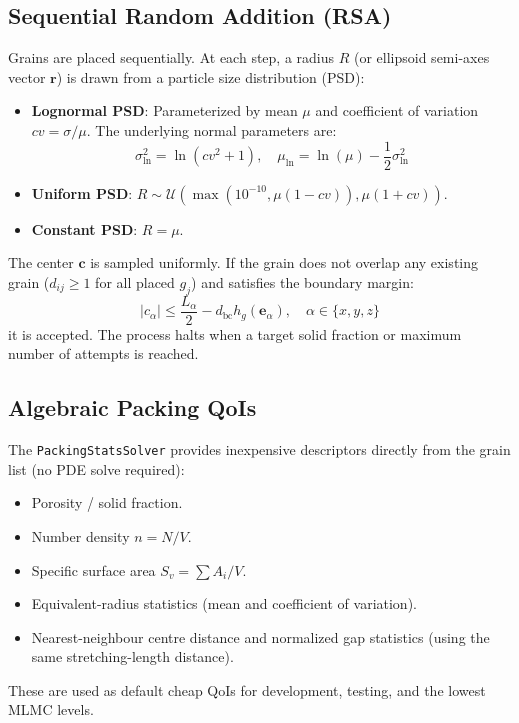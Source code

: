 \documentclass[preprint,12pt]{elsarticle}
\newcommand{\cvec}{\mathbf{c}}
\begin{document}
\subsection{Sequential Random Addition (RSA)}
Grains are placed sequentially. At each step, a radius $R$ (or ellipsoid semi-axes vector $\mathbf{r}$) is drawn from a particle size distribution (PSD):
\begin{itemize}
    \item \textbf{Lognormal PSD}: Parameterized by mean $\mu$ and coefficient of variation $cv = \sigma/\mu$. The underlying normal parameters are:
    \begin{equation}
    \sigma_{\ln}^2 = \ln(cv^2 + 1), \quad \mu_{\ln} = \ln(\mu) - \frac{1}{2} \sigma_{\ln}^2
    \end{equation}
    \item \textbf{Uniform PSD}: $R \sim \mathcal{U}(\max(10^{-10}, \mu(1-cv)), \mu(1+cv))$.
    \item \textbf{Constant PSD}: $R = \mu$.
\end{itemize}
The center $\cvec$ is sampled uniformly. If the grain does not overlap any existing grain ($d_{ij} \ge 1$ for all placed $g_j$) and satisfies the boundary margin:
\begin{equation}
|c_\alpha| \le \frac{L_\alpha}{2} - d_{\text{bc}} h_g(\mathbf{e}_\alpha), \quad \alpha \in \{x, y, z\}
\end{equation}
it is accepted. The process halts when a target solid fraction or maximum number of attempts is reached.

\subsection{Algebraic Packing QoIs}
The \texttt{PackingStatsSolver} provides inexpensive descriptors directly from the grain list (no PDE solve required):
\begin{itemize}
    \item Porosity / solid fraction.
    \item Number density $n = N / V$.
    \item Specific surface area $S_v = \sum A_i / V$.
    \item Equivalent-radius statistics (mean and coefficient of variation).
    \item Nearest-neighbour centre distance and normalized gap statistics (using the same stretching-length distance).
\end{itemize}
These are used as default cheap QoIs for development, testing, and the lowest MLMC levels.
\end{document}
